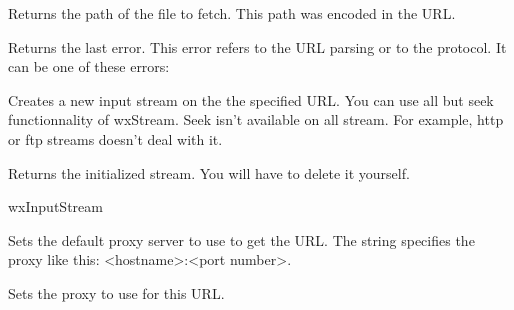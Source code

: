 
Returns the path of the file to fetch. This path was encoded in the URL.

%
%


Returns the last error. This error refers to the URL parsing or to the protocol.
It can be one of these errors:

\twocolwidtha{7cm}
\begin{twocollist}\itemsep=0pt%
\end{twocollist}%

%
%


Creates a new input stream on the the specified URL. You can use all but seek
functionnality of wxStream. Seek isn't available on all stream. For example,
http or ftp streams doesn't deal with it.


Returns the initialized stream. You will have to delete it yourself.


wxInputStream

%
%
\label{wxurlsetdefaultproxy}


Sets the default proxy server to use to get the URL. The string specifies
the proxy like this: <hostname>:<port number>.





%
%
\label{wxurlsetproxy}


Sets the proxy to use for this URL.



